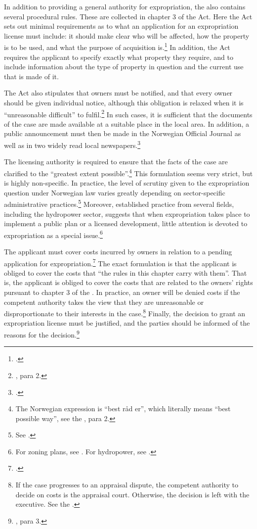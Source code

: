 In addition to providing a general authority for expropriation, the \cite{ea59} also contains several procedural rules. These are collected in chapter 3 of the Act. Here the Act sets out minimal requirements as to what an application for an expropriation license must include: it should make clear who will be affected, how the property is to be used, and what the purpose of acquisition is.\footnote{\dni\cite[11]{ea59}.} In addition, the Act requires the applicant to specify exactly what property they require, and to include information about the type of property in question and the current use that is made of it.

The Act also stipulates that owners must be notified, and that every owner should be given individual notice, although this obligation is relaxed when it is ``unreasonable difficult'' to fulfil.\footnote{\dni\cite[12]{ea59}, para 2.} In such cases, it is sufficient that the documents of the case are made available at a suitable place in the local area. In addition, a public announcement must then be made in the Norwegian Official Journal as well as in two widely read local newspapers.\footnote{\dni\cite[12]{ea59}.}

The licensing authority is required to ensure that the facts of the case are clarified to the ``greatest extent possible''.\footnote{The Norwegian expression is ``best råd er'', which literally means ``best possible way'', see the \dni\cite[12]{ea59}, para 2.} This formulation seems very strict, but is highly non-specific. In practice, the level of scrutiny given to the expropriation question under Norwegian law varies greatly depending on sector-specific administrative practices.\footnote{See \cite[380-381]{dyrkolbotn15b}.} Moreover, established practice from several fields, including the hydropower sector, suggests that when expropriation takes place to implement a public plan or a licensed development, little attention is devoted to expropriation as a special issue.\footnote{For zoning plans, see \cite{namsos98,bo99}. For hydropower, see \cite{jorpeland11}.}

The applicant must cover costs incurred by owners in relation to a pending application for expropriation.\footnote{\dni\cite[15]{ea59}.} The exact formulation is that the applicant is obliged to cover the costs that ``the rules in this chapter carry with them''. That is, the applicant is obliged to cover the costs that are related to the owners' rights pursuant to chapter 3 of the \cite{ea59}. In practice, an owner will be denied costs if the competent authority takes the view that they are unreasonable or disproportionate to their interests in the case.\footnote{If the case progresses to an appraisal dispute, the competent authority to decide on costs is the appraisal court. Otherwise, the decision is left with the executive. See the \dni\cite[15]{ea59}.} Finally, the decision to grant an expropriation license must be justified, and the parties should be informed of the reasons for the decision.\footnote{\dni\cite[12]{ea59}, para 3.}

